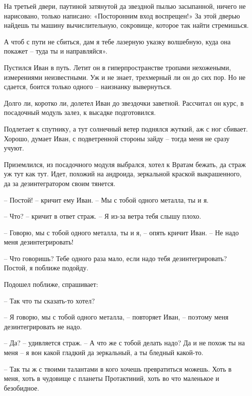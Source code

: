 \documentclass[ebook,oneside,final,openright]{memoir}
\begin{document}
\par
На третьей двери, паутиной затянутой да звездной пылью засыпанной, ничего не нарисовано, только написано: «Посторонним вход воспрещен!» За этой дверью найдешь ты машину вычислительную, сокровище, которое так найти стремишься.\par
\par
А чтоб с пути не сбиться, дам я тебе лазерную указку волшебную, куда она покажет – туда ты и направляйся».\par
\par
Пустился Иван в путь. Летит он в гиперпространстве тропами нехожеными, измерениями неизвестными. Уж и не знает, трехмерный ли он до сих пор. Но не сдается, боится только одного – наизнанку вывернуться.\par
\par
Долго ли, коротко ли, долетел Иван до звездочки заветной. Рассчитал он курс, в посадочный модуль залез, к высадке подготовился.\par
\par
Подлетает к спутнику, а тут солнечный ветер поднялся жуткий, аж с ног сбивает. Хорошо, думает Иван, с подветренной стороны зайду – тогда меня не сразу учуют. \par
\par
 Приземлился, из посадочного модуля выбрался, хотел к Вратам бежать, да страж уж тут как тут. Идет, похожий на андроида, зеркальной краской выкрашенного, да за дезинтегратором своим тянется. \par
 \par
– Постой! – кричит ему Иван. – Мы с тобой одного металла, ты и я. \par
– Что? – кричит в ответ страж. – Я из-за ветра тебя слышу плохо. \par
– Говорю, мы с тобой одного металла, ты и я, – опять кричит Иван. – Не надо меня дезинтегрировать!\par
– Что говоришь? Тебе одного раза мало, если надо тебя дезинтегрировать? Постой, я поближе подойду. \par
Подошел поближе, спрашивает: \par
– Так что ты сказать-то хотел? \par
– Я говорю, мы с тобой одного металла, – повторяет Иван, – поэтому меня дезинтегрировать не надо. \par
– Да? – удивляется страж. – А что же с тобой делать надо? Да и не похож ты на меня – я вон какой гладкий да зеркальный, а ты бледный какой-то. \par
– Так ты ж с твоими талантами в кого хочешь превратиться можешь. Хоть в меня, хоть в чудовище с планеты Протактиний, хоть во что маленькое и безобидное. \par
\end{document}
